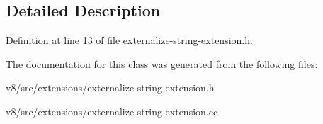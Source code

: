 \subsection{Detailed Description}


Definition at line 13 of file externalize-\/string-\/extension.\+h.



The documentation for this class was generated from the following files\+:\begin{DoxyCompactItemize}
\item 
v8/src/extensions/externalize-\/string-\/extension.\+h\item 
v8/src/extensions/externalize-\/string-\/extension.\+cc\end{DoxyCompactItemize}
